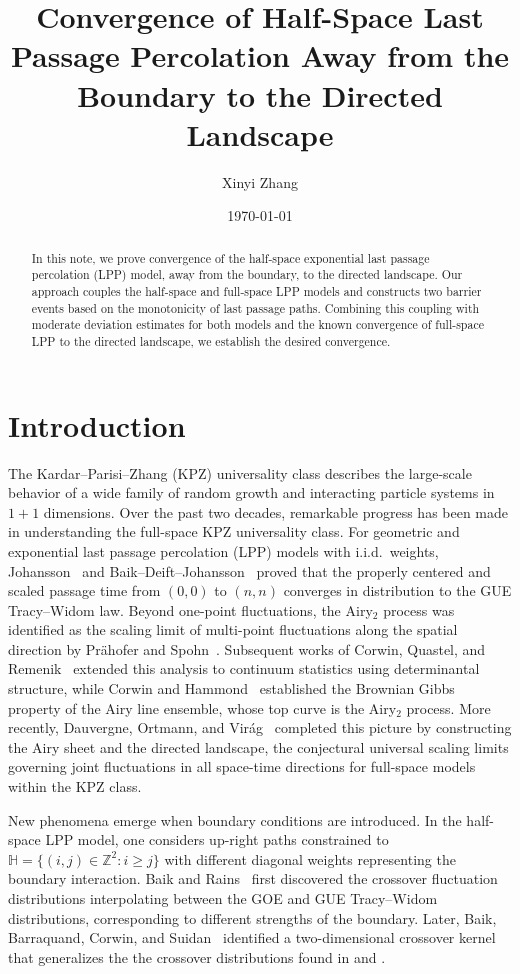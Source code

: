 \documentclass[11pt]{article}
\title{\textbf{Convergence of Half-Space Last Passage Percolation Away from the Boundary to the Directed Landscape}}
\author{Xinyi Zhang}
\date{\today}
\theoremstyle{definition}
\newcommand{\Z}{\mathbb{Z}}
\newcommand{\HH}{\mathbb{H}}
\begin{document}
\maketitle

\begin{abstract}
In this note, we prove convergence of the half-space exponential last passage percolation (LPP) model, away from the boundary, to the directed landscape. Our approach couples the half-space and full-space LPP models and constructs two barrier events based on the monotonicity of last passage paths. Combining this coupling with moderate deviation estimates for both models and the known convergence of full-space LPP to the directed landscape, we establish the desired convergence. 
\end{abstract}


\section{Introduction}
\label{sec:intro}

The Kardar--Parisi--Zhang (KPZ) universality class describes the large-scale behavior of a wide family of random growth and interacting particle systems in $1+1$ dimensions. Over the past two decades, remarkable progress has been made in understanding the full-space KPZ universality class. For geometric and exponential last passage percolation (LPP) models with i.i.d.\ weights, Johansson~\cite{Johansson_2000} and Baik--Deift--Johansson~\cite{baik1999distribution} proved that the properly centered and scaled passage time from $(0,0)$ to $(n,n)$ converges in distribution to the GUE Tracy--Widom law. Beyond one-point fluctuations, the Airy$_2$ process was identified as the scaling limit of multi-point fluctuations along the spatial direction by Pr{\"a}hofer and Spohn~\cite{prahofer2002scale}. Subsequent works of Corwin, Quastel, and Remenik~\cite{corwin2013continuum} extended this analysis to continuum statistics using determinantal structure, while Corwin and Hammond~\cite{corwin2014brownian} established the Brownian Gibbs property of the Airy line ensemble, whose top curve is the Airy$_2$ process. More recently, Dauvergne, Ortmann, and Virág~\cite{dauvergne2022directed} completed this picture by constructing the Airy sheet and the directed landscape, the conjectural universal scaling limits governing joint fluctuations in all space-time directions for full-space models within the KPZ class.


New phenomena emerge when boundary conditions are introduced. In the half-space LPP model, one considers up-right paths constrained to $\HH=\{(i,j)\in\Z^2: i\ge j\}$ with different diagonal weights representing the boundary interaction. Baik and Rains~\cite{baik2000limiting} first discovered the crossover fluctuation distributions interpolating between the GOE and GUE Tracy--Widom distributions, corresponding to different strengths of the boundary. Later, Baik, Barraquand, Corwin, and Suidan~\cite{Baik_2018} identified a two-dimensional crossover kernel that generalizes the the crossover distributions found in \cite{forrester1999correlations} and \cite{sasamoto2004fluctuations}. 
\end{document}
